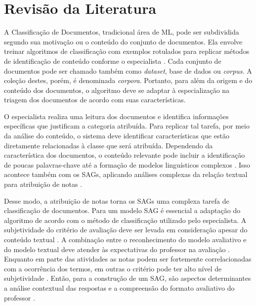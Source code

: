 \chapter{Revisão da Literatura}
\label{cap-literatura}


A Classificação de Documentos, tradicional área de ML, pode ser subdividida segundo sua motivação ou o conteúdo do conjunto de documentos. Ela envolve treinar algoritmos de classificação com exemplos rotulados para replicar métodos de identificação de conteúdo conforme o especialista \cite{baeza2011}. Cada conjunto de documentos pode ser chamado também como \textit{dataset}, base de dados ou \textit{corpus}. A coleção destes, porém, é denominada \textit{corpora}. Portanto, para além da origem e do conteúdo dos documentos, o algoritmo deve se adaptar à especialização na triagem dos documentos de acordo com suas características.

O especialista realiza uma leitura dos documentos e identifica informações específicas que justificam a categoria atribuída. Para replicar tal tarefa, por meio da análise do conteúdo, o sistema deve identificar características que estão diretamente relacionadas à classe que será atribuída. Dependendo da característica dos documentos, o conteúdo relevante pode incluir a identificação de poucas palavras-chave até a formação de modelos linguísticos complexos \cite{jurafsky2009}. Isso acontece também com os SAGs, aplicando análises complexas da relação textual para atribuição de notas \cite{paiva2012, yang2021}.

Desse modo, a atribuição de notas torna os SAGs uma complexa tarefa de classificação de documentos. Para um modelo SAG é essencial a adaptação do algoritmo de acordo com o método de classificação utilizado pelo especialista. A subjetividade do critério de avaliação deve ser levada em consideração apesar do conteúdo textual \cite{pado2021}. A combinação entre o reconhecimento do modelo avaliativo e do modelo textual deve atender às expectativas do professor na avaliação \cite{condor2020}. Enquanto em parte das atividades as notas podem ser fortemente correlacionadas com a ocorrência dos termos, em outras o critério pode ter alto nível de subjetividade \cite{azad2020}. Então, para a construção de um SAG, são aspectos determinantes a análise contextual das respostas e a compreensão do formato avaliativo do professor \cite{mohler2011}.

